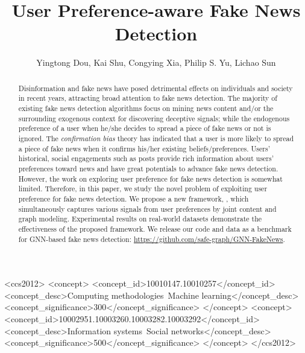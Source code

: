 \documentclass[sigconf]{acmart}
\newcommand\UPFD{\xspace}
\begin{document}
\title{User Preference-aware Fake News Detection}



\author{Yingtong Dou, Kai Shu, Congying Xia, Philip S. Yu, Lichao Sun}









\begin{abstract}


Disinformation and fake news have posed detrimental effects on individuals and society in recent years, attracting broad attention to fake news detection. 
The majority of existing fake news detection algorithms focus on mining news content and/or the surrounding exogenous context for discovering deceptive signals;
while the endogenous preference of a user when he/she decides to spread a piece of fake news or not is ignored.
The \textit{confirmation bias} theory has indicated that a user is more likely to spread a piece of fake news when it confirms his/her existing beliefs/preferences.
Users' historical, social engagements such as posts provide rich information about users' preferences toward news and have great potentials to advance fake news detection.
However, the work on exploring user preference for fake news detection is somewhat limited.
Therefore, in this paper, we study the novel problem of exploiting user preference for fake news detection.
We propose a new framework, \UPFD, which simultaneously captures various signals from user preferences by joint content and graph modeling.
Experimental results on real-world datasets demonstrate the effectiveness of the proposed framework.
We release our code and data as a benchmark for GNN-based fake news detection: \url{https://github.com/safe-graph/GNN-FakeNews}.
\end{abstract}


\begin{CCSXML}
<ccs2012>
   <concept>
       <concept_id>10010147.10010257</concept_id>
       <concept_desc>Computing methodologies~Machine learning</concept_desc>
       <concept_significance>300</concept_significance>
       </concept>
   <concept>
       <concept_id>10002951.10003260.10003282.10003292</concept_id>
       <concept_desc>Information systems~Social networks</concept_desc>
       <concept_significance>500</concept_significance>
       </concept>
 </ccs2012>
\end{CCSXML}
\end{document}
